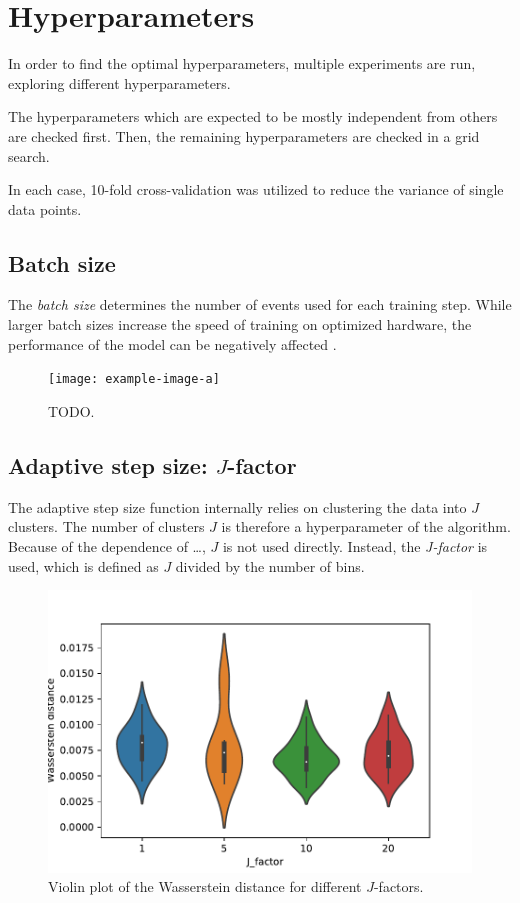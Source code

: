 \section{Hyperparameters}
In order to find the optimal hyperparameters,
multiple experiments are run,
exploring different hyperparameters.

The hyperparameters which are expected to be mostly independent from others are checked first.
Then, the remaining hyperparameters are checked in a grid search. %

In each case, 10-fold cross-validation was utilized to reduce the variance of single data points.


\subsection{Batch size}
The \emph{batch size} determines the number of events used for each training step.
While larger batch sizes increase the speed of training
on optimized hardware,
the performance of the model can be negatively affected \cite{batchsize_kandel}.

\begin{figure}
  \centering
  \texttt{[image: example-image-a]}
  \caption{TODO.}
  \label{fig:hyperparameter:batch_size}
\end{figure}


\subsection{Adaptive step size: $J$-factor}
The adaptive step size function internally relies on clustering the data into $J$ clusters.
The number of clusters $J$ is therefore a hyperparameter of the algorithm.
Because of the dependence of …,
$J$ is not used directly.
Instead, the \emph{J-factor} is used,
which is defined as $J$ divided by the number of bins.

\begin{figure}
  \centering
  \includegraphics[scale=1]{content/plots/halftime/wd_per_J_factor.pdf}
  \caption{Violin plot of the Wasserstein distance for different $J$-factors.}
  \label{fig:hyperparameter:J_factor}
\end{figure}


